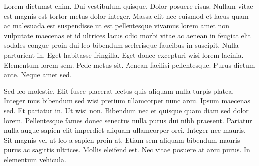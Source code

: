 Lorem dictumst enim. Dui vestibulum quisque. Dolor posuere risus. Nullam vitae est magnis est tortor metus dolor integer. Massa elit nec euismod et lacus quam ac malesuada est suspendisse ut est pellentesque vivamus lorem amet non vulputate maecenas et id ultrices lacus odio morbi vitae ac aenean in feugiat elit sodales congue proin dui leo bibendum scelerisque faucibus in suscipit. Nulla parturient in. Eget habitasse fringilla. Eget donec excepturi wisi lorem lacinia. Elementum lorem sem. Pede metus sit. Aenean facilisi pellentesque. Purus dictum ante. Neque amet sed.

Sed leo molestie. Elit fusce placerat lectus quis aliquam nulla turpis platea. Integer mus bibendum sed wisi pretium ullamcorper nunc arcu. Ipsum maecenas sed. Et pariatur in. Ut wisi non. Bibendum nec et quisque quam diam sed dolor lorem. Pellentesque fames donec senectus nulla purus dui nibh praesent. Pariatur nulla augue sapien elit imperdiet aliquam ullamcorper orci. Integer nec mauris. Sit magnis vel ut leo a sapien proin at. Etiam sem aliquam bibendum mauris purus ac sagittis ultrices. Mollis eleifend est. Nec vitae posuere at arcu purus. In elementum vehicula.
